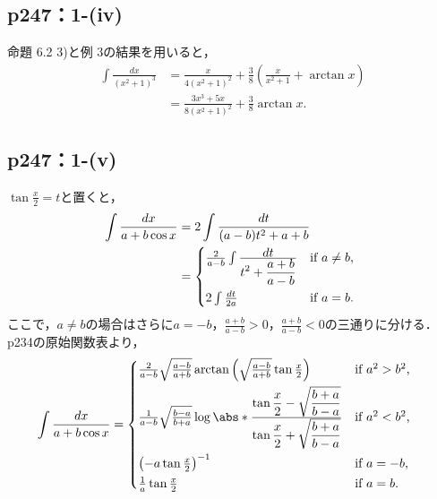 \documentclass[a4paper,10pt,fleqn]{ltjsarticle}
\begin{document}
\subsection*{p247：1-(iv)}

\begin{leftbar}
    命題 6.2 3)と例 3の結果を用いると，
    \begin{align*}
        \int \frac{dx}{(x^2 + 1)^3}
         & = \frac{x}{4(x^2 + 1)^2} + \frac{3}{8}(\frac{x}{x^2 + 1} + \arctan x) \\
         & = \frac{3x^3 + 5x}{8(x^2+1)^2} + \frac{3}{8} \arctan x.
    \end{align*}
\end{leftbar}

\subsection*{p247：1-(v)}


\begin{tleftbar}
    $\tan \frac{x}{2} = t$と置くと，
    \begin{align*}
        \int \frac{dx}{a+b \cos x}
         & = 2 \int \frac{dt}{(a-b)t^2 + a+b} \\
         & =
        \begin{cases*}
            \frac{2}{a-b} \int \frac{\displaystyle dt}{\displaystyle t^2 + \frac{a+b}{a-b}}
                                 & if $a \neq b$, \\
            2 \int \frac{dt}{2a} & if $a = b$.
        \end{cases*}
    \end{align*}
    ここで，$a \neq b$の場合はさらに$a = -b$，$\frac{a+b}{a-b} > 0$，$\frac{a+b}{a-b} < 0$の三通りに分ける．p234の原始関数表より，
    \begin{align*}
        \int \frac{dx}{a+b \cos x}
         & =
        \begin{cases*}
            \frac{2}{a-b} \sqrt{\frac{a-b}{a+b}}
            \arctan \left({\sqrt{\frac{a-b}{a+b}} \tan \frac{x}{2}}\right) & if $a^2 > b^2$, \\
            \frac{1}{a-b} \sqrt{\frac{b-a}{b+a}}
            \log \abs*{\frac{\displaystyle\tan \frac{x}{2}
                    - \sqrt{\frac{b+a}{b-a}}}{\displaystyle\tan \frac{x}{2} + \sqrt{\frac{b+a}{b-a}}}}
                                                                           & if $a^2 < b^2$, \\
            \left(-a \tan \frac{x}{2}\right)^{-1}                          & if $a = -b$,    \\
            \frac{1}{a} \tan {\frac{x}{2}}                                 & if $a = b$.
        \end{cases*}
    \end{align*}
\end{tleftbar}
\end{document}
